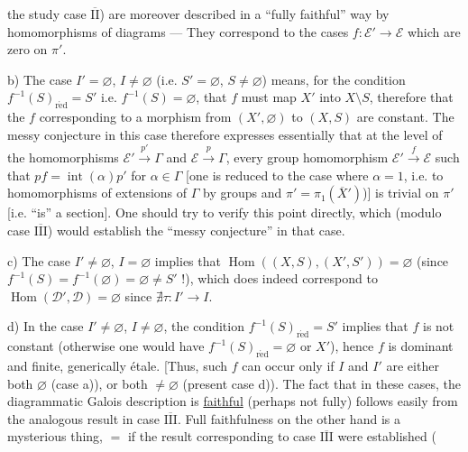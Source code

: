 

the study  case \uline{$\overline{\mathrm{II}}$}) are moreover described in a ``fully faithful'' way by homomorphisms of diagrams --- They correspond to the cases $f:\mathcal E'\to\mathcal E$ which are zero on $\pi'$.

b) The case $I'=\varnothing$, $I\ne\varnothing$ (i.e. $S'=\varnothing$, $S\ne\varnothing$) means, for the condition $f^{-1}(S)_{\mathrm{r\acute ed}}=S'$ i.e. $f^{-1}(S)=\varnothing$, that $f$ must map $X'$ into $X\setminus S$,  therefore that the $f$ corresponding to a morphism from $(X',\varnothing)$ to $(X,S)$ are constant.
The messy conjecture in this case therefore expresses  essentially that at the level of the homomorphisms $\mathcal E'\xrightarrow{p'}\Gamma$ and $\mathcal E\xrightarrow{p}\Gamma$, every group homomorphism $\mathcal E'\xrightarrow{f}\mathcal E$ such that $pf=\operatorname{int}(\alpha)p'$ for $\alpha\in\Gamma$ [one is reduced to the case where $\alpha=1$,  i.e. to homomorphisms of extensions of $\Gamma$ by  groups  and $\pi'=\pi_1(\overline X')$)] is trivial on $\pi'$ [i.e. ``is'' a section]. One should try to verify this point directly, which (modulo case \uline{$\overline{\mathrm{III}}$}) would establish the ``messy conjecture'' in that case.



c) The case $I'\ne\varnothing$, $I=\varnothing$ implies that $\operatorname{Hom}((X,S),(X',S'))=\varnothing$ (since $f^{-1}(S)=f^{-1}(\varnothing)=\varnothing\ne S'$ !), which does indeed correspond  to $\operatorname{Hom}(\mathcal D',\mathcal D)=\varnothing$ since $\nexists\tau:I'\to I$.

d) In the case $I'\ne\varnothing$, $I\ne\varnothing$, the condition $f^{-1}(S)_{\mathrm{r\acute ed}}=S'$ implies that $f$ is not constant (otherwise one would have $f^{-1}(S)_{\mathrm{r\acute ed}}=\varnothing$ or $X'$), hence $f$ is dominant and finite, generically étale. [Thus, such $f$  can occur only if $I$ and $I'$ are either both $\varnothing$ (case a)), or both $\ne\varnothing$ (present case d)). The fact that in these cases, the diagrammatic Galois description is \uline{faithful} (perhaps not fully) follows easily from the analogous result in case \uline{$\overline{\mathrm{III}}$}.
Full faithfulness on the other hand is a mysterious thing, $=$ if the result corresponding   to case \uline{$\overline{\mathrm{III}}$} were established (

